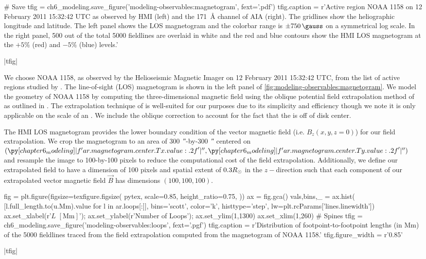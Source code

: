 \begin{pycode}
# Save
tfig = ch6_modeling.save_figure('modeling-observables:magnetogram', fext='.pdf')
tfig.caption = r'Active region NOAA 1158 on 12 February 2011 15:32:42 UTC as observed by HMI (left) and the \SI{171}{\angstrom} channel of AIA (right). The gridlines show the heliographic longitude and latitude. The left panel shows the LOS magnetogram and the colorbar range is $\pm\SI{750}{\gauss}$ on a symmetrical log scale. In the right panel, 500 out of the total 5000 fieldlines are overlaid in white and the red and blue contours show the HMI LOS magnetogram at the $+5\%$ (red) and $-5\%$ (blue) levels.'
\end{pycode}
|tfig|

We choose \AR{} NOAA 1158, as observed by the Helioseismic Magnetic Imager \citep[HMI,][]{hoeksema_helioseismic_2014} on 12 February 2011 15:32:42 UTC, from the list of active regions studied by \citet{warren_systematic_2012}. The line-of-sight (LOS) magnetogram is shown in the left panel of \autoref{fig:modeling-observables:magnetogram}. We model the geometry of \AR{} NOAA 1158 by computing the three-dimensional magnetic field using the oblique potential field extrapolation method of \citet{schmidt_observable_1964} as outlined in \citet[section 3]{sakurai_greens_1982}. The extrapolation technique of \citeauthor{schmidt_observable_1964} is well-suited for our purposes due to its simplicity and efficiency though we note it is only applicable on the scale of an \AR{}. We include the oblique correction to account for the fact that the \AR{} is off of disk center. 

The HMI LOS magnetogram provides the lower boundary condition of the vector magnetic field (i.e. $B_z(x,y,z=0)$) for our field extrapolation. We crop the magnetogram to an area of \SI{300}{\arcsecond}-by-\SI{300}{\arcsecond} centered on $(\py[chapter6_modeling]|f'{ar.magnetogram.center.Tx.value:.2f}'|\si{\arcsecond},\py[chapter6_modeling]|f'{ar.magnetogram.center.Ty.value:.2f}'|\si{\arcsecond})$ and resample the image to 100-by-100 pixels to reduce the computational cost of the field extrapolation. Additionally, we define our extrapolated field to have a dimension of 100 pixels and spatial extent of $0.3R_{\odot}$ in the $z-$direction such that each component of our extrapolated vector magnetic field $\vec{B}$ has dimensions $(100,100,100)$.

\begin{pycode}
fig = plt.figure(figsize=texfigure.figsize(
    pytex,
    scale=0.85,
    height_ratio=0.75,
))
ax = fig.gca()
vals,bins,_ = ax.hist(
    [l.full_length.to(u.Mm).value for l in ar.loops[:]],
    bins='scott', color='k', histtype='step', lw=plt.rcParams['lines.linewidth'])
ax.set_xlabel(r'$L$ $[\si{\mega\m}]$');
ax.set_ylabel(r'Number of Loops');
ax.set_ylim(1,1300)
ax.set_xlim(1,260)
# Spines
tfig = ch6_modeling.save_figure('modeling-observables:loops', fext='.pgf')
tfig.caption = r'Distribution of footpoint-to-footpoint lengths (in Mm) of the 5000 fieldlines traced from the field extrapolation computed from the magnetogram of NOAA 1158.'
tfig.figure_width = r'0.85\textwidth'
\end{pycode}
|tfig|

